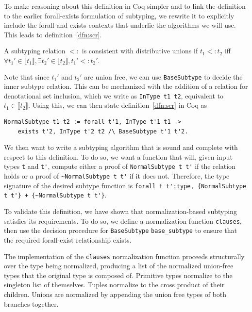 \documentclass[a4paper,english]{lipics-v2019}
\newcommand{\denotes}[1]{\llbracket #1 \rrbracket}
\begin{document}
To make reasoning about this definition in Coq simpler and to link the
definition to the earlier forall-exists formulation of subtyping, we rewrite
it to explicitly include the forall and exists contexts that underlie the
algorithms we will use. This leads to definition~\ref{dfn:scr}.

\begin{definition}
A subtyping relation $<:$ is consistent with distributive unions if $t_1 <: t_2$ iff $\forall t_1' \in \denotes{t_1},
\exists t_2' \in \denotes{t_2}, t_1' <: t_2'$.
\label{dfn:scr}
\end{definition}

Note that since $t_1'$ and $t_2'$ are union free, we can use
\verb|BaseSubtype| to decide the inner subtype relation. This can be
mechanized with the addition of a relation for denotational set inclusion,
which we write as \verb|InType t1 t2|, equivalent to $t_1 \in \denotes{t_2}$.
Using this, we can then state definition~\ref{dfn:scr} in Coq as

\begin{verbatim}
NormalSubtype t1 t2 := forall t'1, InType t'1 t1 -> 
    exists t'2, InType t'2 t2 /\ BaseSubtype t'1 t'2.
\end{verbatim}

We then want to write a subtyping algorithm that is sound and complete with
respect to this definition. To do so, we want a function that will, given
input types \verb|t| and \verb|t'|, compute either a proof of
\verb|NormalSubtype t t'| if the relation holds or a proof of
\verb|~NormalSubtype t t'| if it does not. Therefore, the type signature of
the desired subtype function is \verb|forall t t':type, {NormalSubtype t t'} + {~NormalSubtype t t'}|.

To validate this definition, we have shown that normalization-based 
subtyping satisfies its requirements. To do so, we define a normalization
function \verb|clauses|, then use the decision procedure for \verb|BaseSubtype|
\verb|base_subtype| to ensure that the required forall-exist relationship exists.

The implementation of the \verb|clauses| normalization function proceeds
structurally over the type being normalized, producing a list of the
normalized union-free types that the original type is composed of. Primitive
types normalize to the singleton list of themselves. Tuples normalize to the
cross product of their children. Unions are normalized by appending the union free
types of both branches together. 
\end{document}
